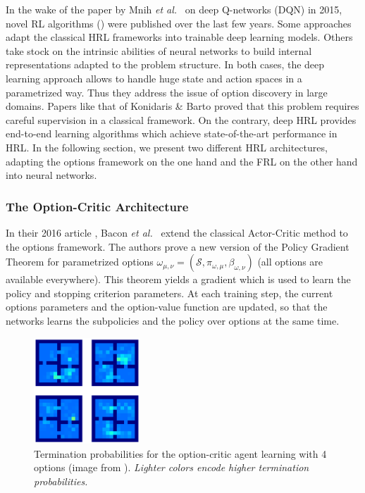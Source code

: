 \documentclass{article}
\newcommand{\etal}{\textit{et al.}}
\begin{document}
In the wake of the paper by Mnih \etal~\cite{mnih_human-level_2015} on deep Q-networks (DQN) in 2015, novel RL algorithms (\cite{alexander_strategic_2016, bacon_option-critic_2016, casanueva_feudal_2018, florensa_stochastic_2017, kulkarni_hierarchical_2016}) were published over the last few years. Some approaches adapt the classical HRL frameworks into trainable deep learning models. Others take stock on the intrinsic abilities of neural networks to build internal representations adapted to the problem structure. In both cases, the deep learning approach allows to handle huge state and action spaces in a parametrized way. Thus they address the issue of option discovery in large domains. Papers like that of Konidaris \& Barto \cite{konidaris_skill_2009} proved that this problem requires careful supervision in a classical framework. On the contrary, deep HRL provides end-to-end learning algorithms which achieve state-of-the-art performance in HRL. In the following section, we present two different HRL architectures, adapting the options framework on the one hand and the FRL on the other hand into neural networks.

\subsubsection{The Option-Critic Architecture}

In their 2016 article \cite{bacon_option-critic_2016}, Bacon \etal~ extend the classical Actor-Critic method to the options framework. The authors prove a new version of the Policy Gradient Theorem for parametrized options $\omega_{\mu, \nu} = (\mathcal{S}, \pi_{\omega, \mu}, \beta_{\omega, \nu})$ (all options are available everywhere). This theorem yields a gradient which is used to learn the policy and stopping criterion parameters. At each training step, the current options parameters and the option-value function are updated, so that the networks learns the subpolicies and the policy over options at the same time.

\begin{figure}
    \centering
    \includegraphics[width=4cm]{images/option-critic-4room.png}
    \caption{Termination probabilities for the option-critic
agent learning with 4 options (image from \cite{bacon_option-critic_2016}). \small \it Lighter colors encode higher termination probabilities.}
    \label{fig:opt-crit}
\end{figure}
\end{document}
